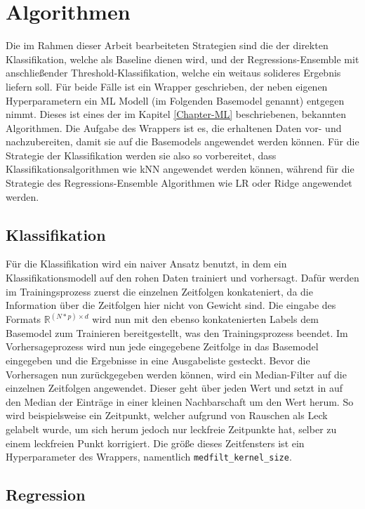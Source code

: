 \section{Algorithmen}

Die im Rahmen dieser Arbeit bearbeiteten Strategien sind die der direkten Klassifikation, welche als Baseline
 dienen wird, und der Regressions-Ensemble mit anschließender Threshold-Klassifikation, welche ein weitaus
 solideres Ergebnis liefern soll. Für beide Fälle ist ein Wrapper geschrieben, der neben eigenen Hyperparametern
 ein ML Modell (im Folgenden Basemodel genannt) entgegen nimmt. Dieses ist eines der im Kapitel \ref{Chapter-ML}
 beschriebenen, bekannten Algorithmen. Die Aufgabe des Wrappers ist es, die erhaltenen Daten vor- und
 nachzubereiten, damit sie auf die Basemodels angewendet werden können. Für die Strategie der Klassifikation
 werden sie also so vorbereitet, dass Klassifikationsalgorithmen wie kNN angewendet werden können, während für
 die Strategie des Regressions-Ensemble Algorithmen wie LR oder Ridge angewendet werden.

\subsection*{Klassifikation}

Für die Klassifikation wird ein naiver Ansatz benutzt, in dem ein Klassifikationsmodell auf den rohen Daten
 trainiert und vorhersagt. Dafür werden im Trainingsprozess zuerst die einzelnen Zeitfolgen konkateniert, da
 die Information über die Zeitfolgen hier nicht von Gewicht sind. Die eingabe des Formats
 $\mathbb{R}^{(N*p) \times d}$ wird nun mit den ebenso konkatenierten Labels dem Basemodel zum Trainieren
 bereitgestellt, was den Trainingsprozess beendet. Im Vorhersageprozess wird nun jede eingegebene Zeitfolge
 in das Basemodel eingegeben und die Ergebnisse in eine Ausgabeliste gesteckt. Bevor die Vorhersagen nun
 zurückgegeben werden können, wird ein Median-Filter auf die einzelnen Zeitfolgen angewendet. Dieser geht
 über jeden Wert und setzt in auf den Median der Einträge in einer kleinen Nachbarschaft um den Wert herum.
 So wird beispielsweise ein Zeitpunkt, welcher aufgrund von Rauschen als Leck gelabelt wurde, um sich herum
 jedoch nur leckfreie Zeitpunkte hat, selber zu einem leckfreien Punkt korrigiert. Die größe dieses Zeitfensters
 ist ein Hyperparameter des Wrappers, namentlich \texttt{medfilt\_kernel\_size}.

\subsection*{Regression}

